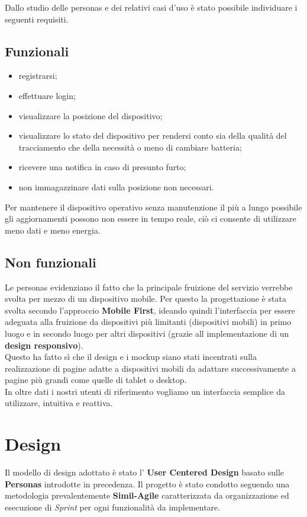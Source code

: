 \documentclass{report}
\begin{document}
Dallo studio delle personas e dei relativi casi d'uso è stato possibile individuare i seguenti requisiti.


\subsection{Funzionali}
\begin{itemize}
    \item registrarsi;
    \item effettuare login;
    \item visualizzare la posizione del dispositivo;
    \item visualizzare lo stato del dispositivo per rendersi conto sia della qualità del tracciamento che della necessità o meno di cambiare batteria;
    \item ricevere una notifica in caso di presunto furto;
    \item non immagazzinare dati sulla posizione non necessari.
\end{itemize}

Per mantenere il dispositivo operativo senza manutenzione il più a lungo possibile gli aggiornamenti possono non essere in tempo reale, ciò ci consente di utilizzare meno dati e meno energia.
\subsection{Non funzionali}
Le personas evidenziano il fatto che la principale fruizione del servizio verrebbe svolta per mezzo di un dispositivo mobile. Per questo la progettazione è stata svolta secondo l'approccio \textbf{Mobile First}, ideando quindi l'interfaccia per essere adeguata alla fruizione da dispositivi più limitanti (dispositivi mobili) in primo luogo e in secondo luogo per altri dispositivi (grazie all implementazione di un \textbf{design responsivo}). \\
Questo ha fatto sì che il design e i mockup siano stati incentrati sulla realizzazione di pagine adatte a dispositivi mobili da adattare successivamente a pagine più grandi come quelle di tablet o desktop.\\
In oltre dati i nostri utenti di riferimento vogliamo un interfaccia semplice da utilizzare, intuitiva e reattiva.
\section{Design}
Il modello di design adottato è stato l' \textbf{User Centered Design} basato sulle \textbf{Personas} introdotte in precedenza. Il progetto è stato condotto seguendo una metodologia prevalentemente \textbf{Simil-Agile} caratterizzata da organizzazione ed esecuzione di \textit{Sprint} per ogni funzionalità da implementare.\\
\end{document}
